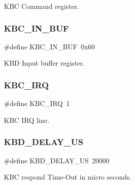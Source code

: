 K\+BC Command register. 

\hypertarget{group__i8042_gaac9289c99cf0a693a211da6d6cb1bb65}{}\label{group__i8042_gaac9289c99cf0a693a211da6d6cb1bb65} 
\subsubsection{\texorpdfstring{K\+B\+C\+\_\+\+I\+N\+\_\+\+B\+UF}{KBC\_IN\_BUF}}
{\footnotesize\ttfamily \#define K\+B\+C\+\_\+\+I\+N\+\_\+\+B\+UF~0x60}



K\+BD Input buffer register. 

\hypertarget{group__i8042_ga16c5827f043d82f87c726c2d4369c11d}{}\label{group__i8042_ga16c5827f043d82f87c726c2d4369c11d} 
\subsubsection{\texorpdfstring{K\+B\+C\+\_\+\+I\+RQ}{KBC\_IRQ}}
{\footnotesize\ttfamily \#define K\+B\+C\+\_\+\+I\+RQ~1}



K\+BC I\+RQ line. 

\hypertarget{group__i8042_ga66c64bf8a64b37d06bc7f788583f52ef}{}\label{group__i8042_ga66c64bf8a64b37d06bc7f788583f52ef} 
\subsubsection{\texorpdfstring{K\+B\+D\+\_\+\+D\+E\+L\+A\+Y\+\_\+\+US}{KBD\_DELAY\_US}}
{\footnotesize\ttfamily \#define K\+B\+D\+\_\+\+D\+E\+L\+A\+Y\+\_\+\+US~20000}



K\+BC respond Time-\/\+Out in micro seconds. 

\hypertarget{group__i8042_gaa81852ab329dba0e94b98ebcd83fc6f2}{}\label{group__i8042_gaa81852ab329dba0e94b98ebcd83fc6f2} 
